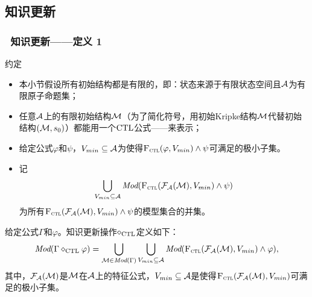 \documentclass[9pt, CJK]{beamer}
\begin{document}
	\subsection{知识更新}
	\begin{frame}
		\frametitle{~知识更新——{\footnotesize 定义 1}}
		{\footnotesize
			\begin{block}{约定}
				\begin{itemize}
					\item 本小节假设所有初始结构都是有限的，即：状态来源于有限状态空间且${\cal A}$为有限原子命题集；
					\item 任意${\cal A}$上的有限初始结构${\cal M}$（为了简化符号，用初始Kripke结构${\cal M}$代替初始结构$({\cal M},s_0)$）都能用一个$\textrm{CTL}$公式——来表示；
					\item 给定公式$\varphi$和$\psi$，$V_{min}\subseteq {\cal A}$为使得${\textsc{F}_{\textsc{ctl}}}(\varphi, V_{min}) \wedge \psi$可满足的极小子集。
					\item 记
					$$\bigcup_{V_{min}\subseteq {\cal A}} \textit{Mod}({\textsc{F}_{\textsc{ctl}}}({\cal F}_{{\cal A}}({\cal M}), V_{min}) \wedge \psi)$$  
					为所有${\textsc{F}_{\textsc{ctl}}}({\cal F}_{{\cal A}}({\cal M}), V_{min}) \wedge \psi$的模型集合的并集。
				\end{itemize}
			\end{block}
			
			\begin{definition}\label{def:KU}
				给定公式$\Gamma$和$\varphi$。知识更新操作$\diamond_{\textrm{CTL}}$定义如下：
				\[
				\textit{Mod}(\Gamma \diamond_{\textrm{CTL}} \varphi) = \bigcup_{{\cal M} \in \textit{Mod}(\Gamma)} \bigcup_{V_{min}\subseteq {\cal A}} \textit{Mod}({\textsc{F}_{\textsc{ctl}}}({\cal F}_{{\cal A}}({\cal M}), V_{min}) \wedge \varphi),
				\]
				其中，${\cal F}_{{\cal A}}({\cal M})$是${\cal M}$在${\cal A}$上的特征公式，$V_{min} \subseteq {\cal A}$是使得${\textsc{F}_{\textsc{ctl}}}({\cal F}_{{\cal A}}({\cal M}), V_{min})$可满足的极小子集。
			\end{definition}
		}
	\end{frame}
	
\end{document}
